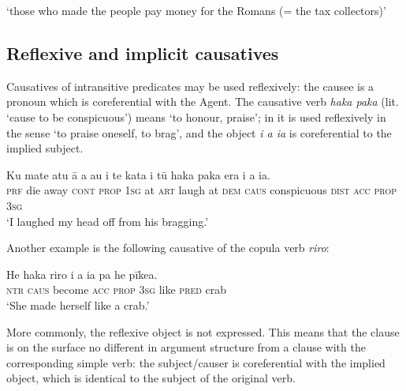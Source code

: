 \glt 
‘those who made the people pay money for the Romans (= the tax collectors)’ \textstyleExampleref{[Luke 7:34]}
\z

\subsection{Reflexive and implicit causatives} \label{sec:8.12.4}

Causatives of intransitive predicates may be used reflexively: the causee is a pronoun which is coreferential with the Agent. The causative verb \textit{haka paka} (lit. ‘cause to be conspicuous’) means ‘to honour, praise’; in  it is used reflexively in the sense ‘to praise oneself, to brag’, and the object \textit{i a ia} is coreferential to the implied subject.

\ea\label{ex:8.238}
\gll Ku mate atu {\ꞌ}ā a au {\ꞌ}i te kata {\ꞌ}i tū haka paka era  i a ia.\\
\textsc{prf} die away \textsc{cont} \textsc{prop} \textsc{1sg} at \textsc{art} laugh at \textsc{dem} \textsc{caus} conspicuous \textsc{dist}  \textsc{acc} \textsc{prop} \textsc{3sg}\\

\glt
‘I laughed my head off from his bragging.’ \textstyleExampleref{[R230.172]} 
\z

Another example is the following causative of the copula verb \textit{riro}:

\ea\label{ex:8.239}
\gll He haka riro i a ia pa he pīkea. \\
\textsc{ntr} \textsc{caus} become \textsc{acc} \textsc{prop} \textsc{3sg} like \textsc{pred} crab \\

\glt
‘She made herself like a crab.’ \textstyleExampleref{[R310.050]} 
\z

More commonly, the reflexive object is not expressed. This means that the clause is on the surface no different in argument structure from a clause with the corresponding simple verb: the subject/causer is coreferential with the implied object, which is identical to the subject of the original verb.

